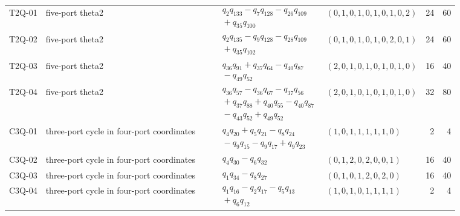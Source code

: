 \begin{longtable}{l L{.16\linewidth} L{.34\linewidth} L{.18\linewidth} r r}
T2Q-01 & five-port theta2 & $\begin{aligned}&\quad q_{2}q_{133}-q_{7}q_{128}-q_{26}q_{109}\\&\quad +q_{35}q_{100}\end{aligned}$ & $(0,1,0,1,0,1,0,1,0,2)$ & 24 & 60\\
T2Q-02 & five-port theta2 & $\begin{aligned}&\quad q_{2}q_{135}-q_{9}q_{128}-q_{28}q_{109}\\&\quad +q_{35}q_{102}\end{aligned}$ & $(0,1,0,1,0,1,0,2,0,1)$ & 24 & 60\\
T2Q-03 & five-port theta2 & $\begin{aligned}&\quad q_{36}q_{91}+q_{37}q_{64}-q_{40}q_{87}\\&\quad -q_{49}q_{52}\end{aligned}$ & $(2,0,1,0,1,0,1,0,1,0)$ & 16 & 40\\
T2Q-04 & five-port theta2 & $\begin{aligned}&\quad q_{36}q_{57}-q_{36}q_{67}-q_{37}q_{56}\\&\quad +q_{37}q_{88}+q_{40}q_{55}-q_{40}q_{87}\\&\quad -q_{43}q_{52}+q_{49}q_{52}\end{aligned}$ & $(2,0,1,0,1,0,1,0,1,0)$ & 32 & 80\\
C3Q-01 & three-port cycle in four-port coordinates & $\begin{aligned}&\quad q_{4}q_{20}+q_{5}q_{21}-q_{8}q_{24}\\&\quad -q_{9}q_{15}-q_{9}q_{17}+q_{9}q_{23}\end{aligned}$ & $(1,0,1,1,1,1,1,0)$ & 2 & 4\\
C3Q-02 & three-port cycle in four-port coordinates & $\begin{aligned}&\quad q_{4}q_{30}-q_{6}q_{32}\end{aligned}$ & $(0,1,2,0,2,0,0,1)$ & 16 & 40\\
C3Q-03 & three-port cycle in four-port coordinates & $\begin{aligned}&\quad q_{1}q_{34}-q_{8}q_{27}\end{aligned}$ & $(0,1,0,1,2,0,2,0)$ & 16 & 40\\
C3Q-04 & three-port cycle in four-port coordinates & $\begin{aligned}&\quad q_{1}q_{16}-q_{2}q_{17}-q_{5}q_{13}\\&\quad +q_{6}q_{12}\end{aligned}$ & $(1,0,1,0,1,1,1,1)$ & 2 & 4\\

\end{longtable}
